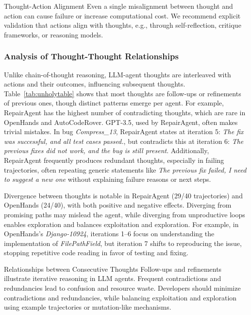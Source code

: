 \documentclass[conference,10pt]{IEEEtran}
\theoremstyle{definition}        %
\newcommand{\ra}{Repair\-Agent}
\newcommand{\oh}{Open\-Hands}
\newcommand{\acr}{Auto\-Code\-Rover}
\begin{document}
\begin{findingsbox}{Thought-Action Alignment}
Even a single misalignment between thought and action can cause failure or increase computational cost. 
We re\-commend explicit validation that actions align with thoughts, e.g., through self-reflection, critique frameworks, or reasoning models.
\end{findingsbox}


\subsubsection{\textbf{Analysis of Thought-Thought Relationships}}






Unlike chain-of-thought reasoning, LLM-agent thoughts are interleaved with actions and their outcomes, influencing subsequent thoughts.
Table~\ref{tab:unholytable} shows that most thoughts are follow-ups or refinements of previous ones, though distinct patterns emerge per agent.
For example, \ra{} has the highest number of contradicting thoughts, which are rare in \oh{} and \acr{}.
GPT-3.5, used by \ra{}, often makes trivial mistakes.
In bug \textit{Compress\_13}, \ra{} states at iteration 5: \textit{The fix was successful, and all test cases passed.}, but contradicts this at iteration 6: \textit{The previous fixes did not work, and the bug is still present}.
Additionally, \ra{} frequently produces redundant thoughts, especially in failing trajectories, often repeating generic statements like \textit{The previous fix failed, I need to suggest a new one} without explaining failure reasons or next steps.

Divergence between thoughts is notable in \ra{} (29/40 trajectories) and \oh{} (24/40), with both positive and negative effects.
Diverging from promising paths may mislead the agent, while diverging from unproductive loops enables exploration and balances exploitation and exploration.
For example, in \oh{}'s \textit{Django-10924}, iterations 1–6 focus on understanding the implementation of \textit{FilePathField}, but iteration 7 shifts to reproducing the issue, stopping repetitive code reading in favor of testing and fixing.

\begin{findingsbox}{Relationships between Consecutive Thoughts}
Follow-ups and refinements illustrate iterative reasoning in LLM agents. Frequent contradictions and redundancies lead to confusion and resource waste. Developers should minimize contradictions and redundancies, while balancing exploitation and exploration using example trajectories or mutation-like mechanisms.
\end{findingsbox}
\end{document}
